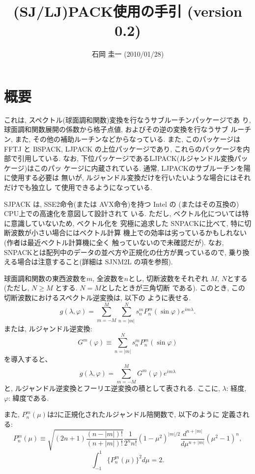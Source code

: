 \documentclass[a4j]{jarticle}
\title{(SJ/LJ)PACK使用の手引 (version 0.2)}
\author{石岡 圭一  (2010/01/28)}
\date{}
\begin{document}
\maketitle

\section{概要}

これは, スペクトル(球面調和関数)変換を行なうサブルーチンパッケージであ
り, 球面調和関数展開の係数から格子点値, およびその逆の変換を行なうサブ
ルーチン, また, その他の補助ルーチンなどからなっている. 
また, このパッケージは FFTJ と BSPACK, LJPACK の上位パッケージであり, 
これらのパッケージを内部で引用している.
なお, 下位パッケージであるLJPACK(ルジャンドル変換パッケージ)はこのパッ
ケージに内蔵されている. 通常, LJPACKのサブルーチンを陽に使用する必要は
無いが, ルジャンドル変換だけを行いたいような場合にはそれだけでも独立し
て使用できるようになっている.

SJPACK は, SSE2命令(または AVX命令)を持つ Intel の
(またはその互換の) CPU上での高速化を意図して設計されて
いる. ただし, ベクトル化については特に意識していないため, ベクトル化を
究極に追求した SNPACKに比べて, 特に切断波数が小さい場合にはベクトル計算
機上での効率は劣っているかもしれない(作者は最近ベクトル計算機に全く
触っていないので未確認だが).
なお, SNPACKとは配列中のデータの並べ方や正規化の仕方が異っているので, 
乗り換える場合は注意すること(詳細は SJNM2L の項を参照).

球面調和関数の東西波数を$m$, 全波数を$n$とし, 切断波数をそれぞれ
$M$, $N$とする(ただし, $N\ge M$ とする. $N=M$としたときが三角切断
である). このとき, この切断波数におけるスペクトル逆変換は, 以下の
ように表せる.
\begin{equation}
g(\lambda,\varphi)=\sum^M_{m=-M}\sum^N_{n=|m|}
s^m_nP^m_n(\sin\varphi)e^{im\lambda}.
\end{equation}
または, ルジャンドル逆変換:
\begin{equation}
G^m(\varphi)\equiv\sum^N_{n=|m|}s^m_nP^m_n(\sin\varphi)
\end{equation}
を導入すると、
\begin{equation}
g(\lambda,\varphi)=\sum^M_{m=-M}G^m(\varphi)e^{im\lambda}
\end{equation}
と, ルジャンドル逆変換とフーリエ逆変換の積として表される.
ここに, $\lambda$: 経度, $\varphi$: 緯度である.

また, $P^m_n(\mu)$は2に正規化されたルジャンドル陪関数で, 以下のように
定義される:
\begin{equation}
P^m_n(\mu)\equiv\sqrt{(2n+1)\frac{(n-|m|)!}{(n+|m|)!}}
\frac1{2^nn!}(1-\mu^2)^{|m|/2}
\frac{d^{n+|m|}}{d\mu^{n+|m|}}(\mu^2-1)^n,
\end{equation}
\begin{equation}
\int^1_{-1}\{P^m_n(\mu)\}^2d\mu=2.
\end{equation}
\end{document}
